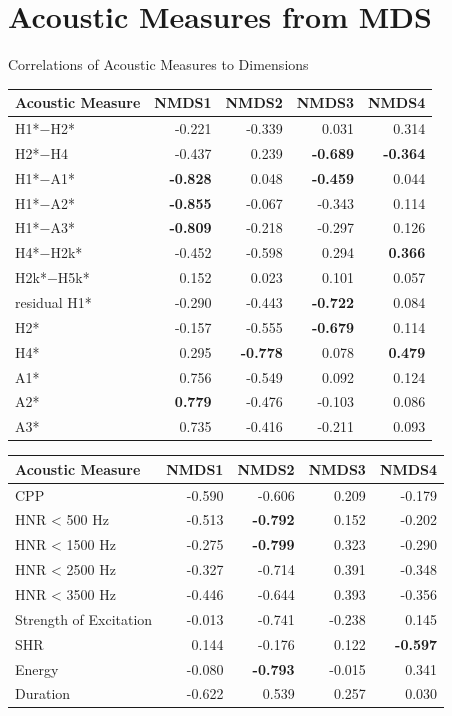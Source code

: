\documentclass[professionalfonts]{beamer}
\providecommand{\lsptoprule}{\midrule\toprule}
\providecommand{\lspbottomrule}{\bottomrule\midrule}
\begin{document}
\section{Acoustic Measures from MDS}
\begin{frame}[t,allowframebreaks]{Correlations of Acoustic Measures to Dimensions}
  \small
  \begin{longtable}{lrrrr}
    \lsptoprule
    \textbf{Acoustic Measure} & \textbf{NMDS1} & \textbf{NMDS2} & \textbf{NMDS3} & \textbf{NMDS4} \\
    \midrule
    H1*$-$H2* & -0.221 & -0.339 & 0.031 & 0.314 \\
    H2*$-$H4 & -0.437 & 0.239 & \textbf{-0.689} & \textbf{-0.364} \\
    H1*$-$A1* & \textbf{-0.828} & 0.048 & \textbf{-0.459} & 0.044 \\
    H1*$-$A2* & \textbf{-0.855} & -0.067 & -0.343 & 0.114 \\
    H1*$-$A3* & \textbf{-0.809} & -0.218 & -0.297 & 0.126 \\
    H4*$-$H2k* & -0.452 & -0.598 & 0.294 & \textbf{0.366} \\
    H2k*$-$H5k* & 0.152 & 0.023 & 0.101 & 0.057 \\
    residual H1* & -0.290 & -0.443 & \textbf{-0.722} & 0.084 \\
    H2* & -0.157 & -0.555 & \textbf{-0.679} & 0.114 \\
    H4* & 0.295 & \textbf{-0.778} & 0.078 & \textbf{0.479} \\
    A1* & 0.756 & -0.549 & 0.092 & 0.124 \\
    A2* & \textbf{0.779} & -0.476 & -0.103 & 0.086 \\
    A3* & 0.735 & -0.416 & -0.211 & 0.093 \\
    \lspbottomrule
  \end{longtable}

  \begin{longtable}{lrrrr}
    \lsptoprule
    \textbf{Acoustic Measure} & \textbf{NMDS1} & \textbf{NMDS2} & \textbf{NMDS3} & \textbf{NMDS4} \\
    \midrule
    CPP & -0.590 & -0.606 & 0.209 & -0.179 \\
    HNR < 500 Hz & -0.513 & \textbf{-0.792} & 0.152 & -0.202 \\
    HNR < 1500 Hz & -0.275 & \textbf{-0.799} & 0.323 & -0.290 \\
    HNR < 2500 Hz & -0.327 & -0.714 & 0.391 & -0.348 \\
    HNR < 3500 Hz & -0.446 & -0.644 & 0.393 & -0.356 \\
    Strength of Excitation & -0.013 & -0.741 & -0.238 & 0.145 \\
    SHR & 0.144 & -0.176 & 0.122 & \textbf{-0.597} \\
    Energy & -0.080 & \textbf{-0.793} & -0.015 & 0.341 \\
    Duration & -0.622 & 0.539 & 0.257 & 0.030 \\
    \lspbottomrule
  \end{longtable}
\end{frame}
\end{document}
